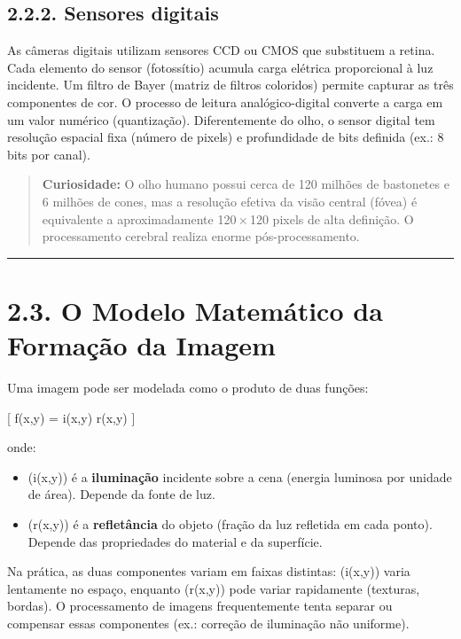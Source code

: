 \documentclass[
  portuguese,
  letterpaper,
  openany,
  oneside,
  12pt,
  a4paper]{book}
\providecommand{\tightlist}{%
  \setlength{\itemsep}{0pt}\setlength{\parskip}{0pt}}
\begin{document}
\begin{tcolorbox}
\subsection{2.2.2. Sensores digitais}\label{sensores-digitais}

As câmeras digitais utilizam sensores CCD ou CMOS que substituem a
retina. Cada elemento do sensor (fotossítio) acumula carga elétrica
proporcional à luz incidente. Um filtro de Bayer (matriz de filtros
coloridos) permite capturar as três componentes de cor. O processo de
leitura analógico-digital converte a carga em um valor numérico
(quantização). Diferentemente do olho, o sensor digital tem resolução
espacial fixa (número de pixels) e profundidade de bits definida (ex.: 8
bits por canal).

\begin{quote}
\textbf{Curiosidade:} O olho humano possui cerca de 120 milhões de
bastonetes e 6 milhões de cones, mas a resolução efetiva da visão
central (fóvea) é equivalente a aproximadamente 120\,×\,120 pixels de
alta definição. O processamento cerebral realiza enorme
pós-processamento.
\end{quote}

\begin{center}\rule{0.5\linewidth}{0.5pt}\end{center}

\section{2.3. O Modelo Matemático da Formação da
Imagem}\label{o-modelo-matemuxe1tico-da-formauxe7uxe3o-da-imagem}

Uma imagem pode ser modelada como o produto de duas funções:

{[} f(x,y) = i(x,y) \cdot r(x,y) {]}

onde:

\begin{itemize}
\tightlist
\item
  (i(x,y)) é a \textbf{iluminação} incidente sobre a cena (energia
  luminosa por unidade de área). Depende da fonte de luz.
\item
  (r(x,y)) é a \textbf{refletância} do objeto (fração da luz refletida
  em cada ponto). Depende das propriedades do material e da superfície.
\end{itemize}

Na prática, as duas componentes variam em faixas distintas: (i(x,y))
varia lentamente no espaço, enquanto (r(x,y)) pode variar rapidamente
(texturas, bordas). O processamento de imagens frequentemente tenta
separar ou compensar essas componentes (ex.: correção de iluminação não
uniforme).


\end{tcolorbox}
\end{document}
